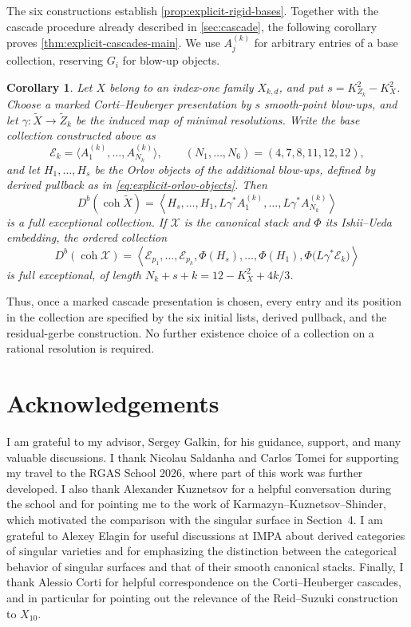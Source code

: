 \documentclass[11pt]{article}
\theoremstyle{plain}
\newtheorem{corollary}[corollary]{Corollary}
\theoremstyle{definition}
\theoremstyle{remark}
\newcommand{\Db}{D^b}
\newcommand{\coh}{\operatorname{coh}}
\newcommand{\XX}{\mathcal X}
\begin{document}
The six constructions establish \cref{prop:explicit-rigid-bases}.
Together with the cascade procedure already described in
\cref{sec:cascade}, the following corollary proves
\cref{thm:explicit-cascades-main}. We use \(A^{(k)}_j\) for arbitrary
entries of a base collection, reserving \(G_i\) for blow-up objects.

\begin{corollary}\label{cor:explicit-cascade-collections}
Let \(X\) belong to an index-one family \(X_{k,d}\), and put
\(s=K_{Z_k}^2-K_X^2\). Choose a marked Corti--Heuberger presentation by
\(s\) smooth-point blow-ups, and let
\(\gamma:\widetilde X\to\widetilde Z_k\) be the induced map of
minimal resolutions. Write the base collection constructed above as
\[
\mathscr E_k=\langle A^{(k)}_1,\ldots,A^{(k)}_{N_k}\rangle,
\qquad (N_1,\ldots,N_6)=(4,7,8,11,12,12),
\]
and let \(H_1,\ldots,H_s\) be the Orlov objects of the additional
blow-ups, defined by derived pullback as in
\eqref{eq:explicit-orlov-objects}. Then
\[
\Db(\coh\widetilde X)=
\left\langle H_s,\ldots,H_1,
L\gamma^*A^{(k)}_1,\ldots,L\gamma^*A^{(k)}_{N_k}\right\rangle
\]
is a full exceptional collection. If \(\XX\) is the canonical stack
and \(\Phi\) its Ishii--Ueda embedding, the ordered collection
\[
\Db(\coh\XX)=\left\langle
\mathcal E_{p_1},\ldots,\mathcal E_{p_k},
\Phi(H_s),\ldots,\Phi(H_1),
\Phi\bigl(L\gamma^*\mathscr E_k\bigr)
\right\rangle
\]
is full exceptional, of length
\(N_k+s+k=12-K_X^2+4k/3\).
\end{corollary}

Thus, once a marked cascade presentation is chosen, every entry and its
position in the collection are specified by the six initial lists,
derived pullback, and the residual-gerbe construction. No further
existence choice of a collection on a rational resolution is required.


\section*{Acknowledgements}
I am grateful to my advisor, Sergey Galkin, for his guidance, support, and many valuable discussions. I thank Nicolau Saldanha and Carlos Tomei for supporting my travel to the RGAS School 2026, where part of this work was further developed. I also thank Alexander Kuznetsov for a helpful conversation during the school and for pointing me to the work of Karmazyn--Kuznetsov--Shinder, which motivated the comparison with the singular surface in Section~4. I am grateful to Alexey Elagin for useful discussions at IMPA about derived categories of singular varieties and for emphasizing the distinction between the categorical behavior of singular surfaces and that of their smooth canonical stacks. Finally, I thank Alessio Corti for helpful correspondence on the Corti--Heuberger cascades, and in particular for pointing out the relevance of the Reid--Suzuki construction to \(X_{10}\).
\end{document}
